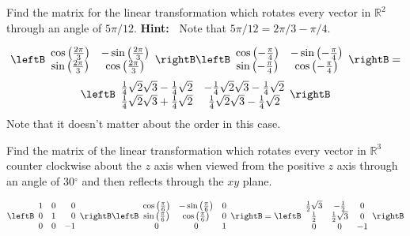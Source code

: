 \begin{enumialphparenastyle}
\begin{ex} Find the matrix for the linear transformation which rotates every
vector in $\mathbb{R}^{2}$ through an angle of $5\pi /12.$ \textbf{Hint:\ }
Note that $5\pi /12=2\pi /3-\pi /4.$
\begin{sol}
\[
\leftB
\begin{array}{cc}
\cos \left( \frac{2\pi }{3}\right) & -\sin \left( \frac{2\pi }{3}\right) \\
\sin \left( \frac{2\pi }{3}\right) & \cos \left( \frac{2\pi }{3}\right)
\end{array}
\rightB \leftB
\begin{array}{cc}
\cos \left( -\frac{\pi }{4}\right) & -\sin \left( -\frac{\pi }{4}\right) \\
\sin \left( -\frac{\pi }{4}\right) & \cos \left( -\frac{\pi }{4}\right)
\end{array}
\rightB = 
\]
\[
\leftB
\begin{array}{cc}
\frac{1}{4}\sqrt{2}\sqrt{3}-\frac{1}{4}\sqrt{2} & -\frac{1}{4}\sqrt{2}\sqrt{3
}-\frac{1}{4}\sqrt{2} \\
\frac{1}{4}\sqrt{2}\sqrt{3}+\frac{1}{4}\sqrt{2} & \frac{1}{4}\sqrt{2}\sqrt{3}
-\frac{1}{4}\sqrt{2}
\end{array}
\rightB
\]
Note that it doesn't matter about the order in this case.
\end{sol}
\end{ex}

\begin{ex} Find the matrix of the linear transformation which rotates every
vector in $\mathbb{R}^{3}$ counter clockwise about the $z$ axis when viewed
from the positive $z$ axis through an angle of 30$^{\circ }$ and then
reflects through the $xy$ plane.
\begin{sol}
\[
\leftB
\begin{array}{rrr}
1 & 0 & 0 \\
0 & 1 & 0 \\
0 & 0 & -1
\end{array}
\rightB \leftB
\begin{array}{ccc}
\cos \left( \frac{\pi }{6}\right)  & -\sin \left( \frac{\pi }{6}\right)  & 0
\\
\sin \left( \frac{\pi }{6}\right)  & \cos \left( \frac{\pi }{6}\right)  & 0
\\
0 & 0 & 1
\end{array}
\rightB = \leftB
\begin{array}{ccc}
\frac{1}{2}\sqrt{3} & -\frac{1}{2} & 0 \\
\frac{1}{2} & \frac{1}{2}\sqrt{3} & 0 \\
0 & 0 & -1
\end{array}
\rightB
\]
\end{sol}
\end{ex}
 

\end{enumialphparenastyle}

